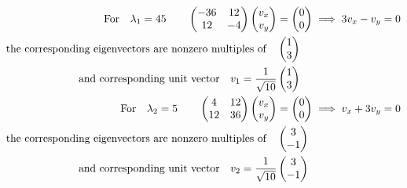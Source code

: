 \documentclass{article}
\begin{document}
\begin{align*}
    \qq*{For}\lambda_1=45\qquad\begin{pmatrix}
        -36 & 12 \\12 &-4
    \end{pmatrix}\begin{pmatrix}
        v_x \\v_y
    \end{pmatrix} & =  \begin{pmatrix}
        0 \\0
    \end{pmatrix}\implies 3v_x-v_y=0 \\
    \qq*{the corresponding eigenvectors are nonzero multiples of}                   & \begin{pmatrix}
        1 \\ 3
    \end{pmatrix}                       \\
    \qq*{and corresponding unit vector}v_1=\frac{1}{\sqrt{10}}                      & \begin{pmatrix}
        1 \\ 3
    \end{pmatrix}                       \\
    \qq*{For}\lambda_2=5\qquad\begin{pmatrix}
        4 & 12 \\12 &36
    \end{pmatrix}\begin{pmatrix}
        v_x \\v_y
    \end{pmatrix}  & =  \begin{pmatrix}
        0 \\0
    \end{pmatrix}\implies v_x+3v_y=0 \\
    \qq*{the corresponding eigenvectors are nonzero multiples of}                   & \begin{pmatrix}
        3 \\ -1
    \end{pmatrix}                       \\                                                                               \qq*{and corresponding unit vector}v_2=\frac{1}{\sqrt{10}}                   & \begin{pmatrix}
        3 \\ -1
    \end{pmatrix}                       \\
    \\
\end{align*}
\end{document}
